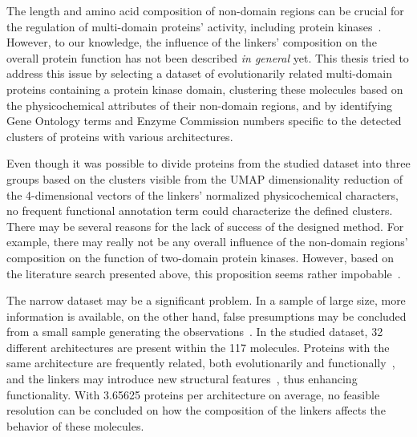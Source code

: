 \label{discussion}

The length and amino acid composition of non-domain regions can be crucial for the
regulation of multi-domain proteins' activity, including protein
kinases~\cite{gogl2019disordered, vigil2004conformational}. %
However, to our knowledge, the influence of the linkers' composition on the overall
protein function has not been described \emph{in general} yet.
This thesis tried to address this issue by selecting a dataset of evolutionarily related
multi-domain proteins containing a protein kinase domain, clustering these molecules
based on the physicochemical attributes of their non-domain regions, and by identifying
Gene Ontology terms and Enzyme Commission numbers specific to the detected clusters of
proteins with various architectures.

Even though it was possible to divide proteins from the studied dataset into three groups
based on the clusters visible from the UMAP dimensionality reduction of the 4-dimensional
vectors of the linkers' normalized physicochemical characters, no frequent functional
annotation term could characterize the defined clusters.
There may be several reasons for the lack of success of the designed method.
For example, there may really not be any overall influence of the non-domain regions'
composition on the function of two-domain protein kinases.
However, based on the literature search presented above, this proposition seems rather
impobable~\cite{winkler1977tomato, van1997linker, ikebe1998hinge, robinson1998optimizing,
rice1999structural, gokhale2000role, case2000role, pufall2002autoinhibitory,
khalil2008kinesin, hariharan2009insights, smock2010interdomain, liu2010molecular,
shastry2010neck, ma2011dynamic, cyrus2011impact, kalodimos2011nmr, pohane2015modulation,
klement2015effect, rozycki2017length, jakubec2018widespread, gogl2019disordered}.

The narrow dataset may be a significant problem.
In a sample of large size, more information is available, on the other hand, false
presumptions may be concluded from a small sample generating the
observations~\cite{tanaka1987big, hua2005optimal}.
In the studied dataset, 32 different architectures are present within the 117 molecules.
Proteins with the same architecture are frequently related, both evolutionarily and
functionally~\cite{vogel2004structure, hegyi2001annotation, bashton2002geometry}, and the
linkers may introduce new structural features~\cite{papaleo2016role}, thus enhancing
functionality.
With 3.65625 proteins per architecture on average, no feasible resolution can be
concluded on how the composition of the linkers affects the behavior of these molecules.

